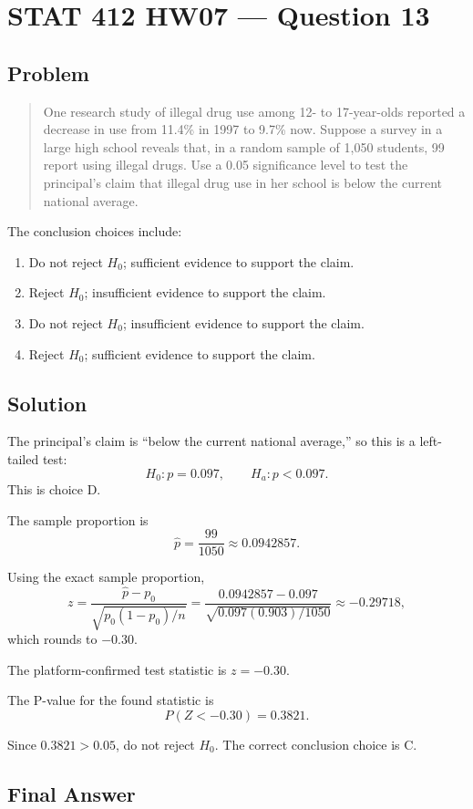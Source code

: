 \documentclass[11pt]{article}
\begin{document}
\section*{STAT 412 HW07 --- Question 13}

\subsection*{Problem}

\begin{quote}
One research study of illegal drug use among 12- to 17-year-olds reported a decrease in use from 11.4\% in 1997 to 9.7\% now. Suppose a survey in a large high school reveals that, in a random sample of 1,050 students, 99 report using illegal drugs. Use a 0.05 significance level to test the principal's claim that illegal drug use in her school is below the current national average.
\end{quote}

The conclusion choices include:
\begin{enumerate}
\item[A.] Do not reject $H_0$; sufficient evidence to support the claim.
\item[B.] Reject $H_0$; insufficient evidence to support the claim.
\item[C.] Do not reject $H_0$; insufficient evidence to support the claim.
\item[D.] Reject $H_0$; sufficient evidence to support the claim.
\end{enumerate}

\subsection*{Solution}

The principal's claim is ``below the current national average,'' so this is a left-tailed test:
\[
H_0:p=0.097,\qquad H_a:p<0.097.
\]
This is choice D.

The sample proportion is
\[
\hat{p}=\frac{99}{1050}\approx 0.0942857.
\]

Using the exact sample proportion,
\[
z=\frac{\hat{p}-p_0}{\sqrt{p_0(1-p_0)/n}}
  =\frac{0.0942857-0.097}{\sqrt{0.097(0.903)/1050}}
  \approx -0.29718,
\]
which rounds to $-0.30$.

The platform-confirmed test statistic is $z=-0.30$.

The P-value for the found statistic is
\[
P(Z<-0.30)=0.3821.
\]

Since $0.3821>0.05$, do not reject $H_0$. The correct conclusion choice is C.

\subsection*{Final Answer}

\end{document}
